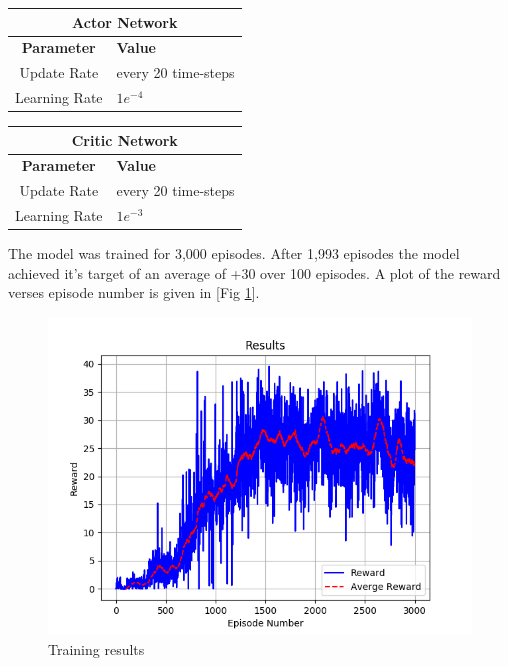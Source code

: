 \documentclass[12pt]{article}
\begin{document}
\begin{table}
\begin{minipage}{.5\linewidth}
\begin{tabular}{|c|l|}
	\hline
	\multicolumn{2}{|c|}{\textbf{Actor Network}}\\
	\hline
	\hline
	\textbf{Parameter} & \textbf{Value}\\
	\hline
		Update Rate & every 20 time-steps \\
		Learning Rate & $1e^{-4}$ \\
	\hline
\end{tabular}
\end{minipage}
\begin{minipage}{.5\linewidth}
\begin{tabular}{|c|l|}
	\hline
	\multicolumn{2}{|c|}{\textbf{Critic Network}}\\
	\hline
	\hline
	\textbf{Parameter} & \textbf{Value}\\
	\hline
		Update Rate & every 20 time-steps \\
		Learning Rate & $1e^{-3}$ \\
	\hline
\end{tabular}
\end{minipage}
\end{table}

The model was trained for 3,000 episodes. 
After 1,993 episodes the model achieved it's target of an average of +30 over 100 episodes.
A plot of the reward verses episode number is given in [Fig \ref{results}].

\begin{figure}
	\centering
	\includegraphics[width=0.8\linewidth]{./img/Results.png}
	\caption{Training results}
	\label{results}
\end{figure}
\end{document}
